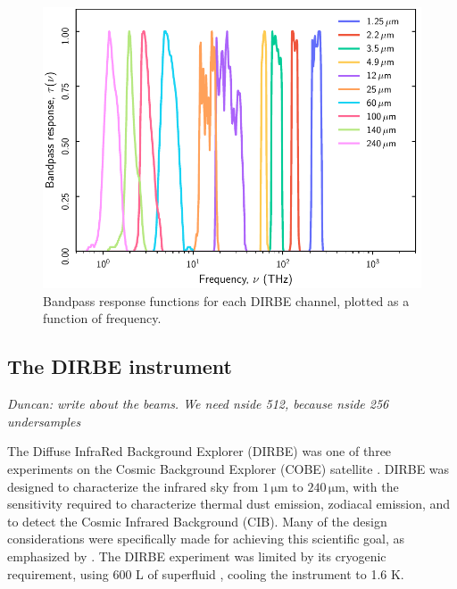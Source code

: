 \documentclass{aa}
\begin{document}
\begin{figure}
  \centering
  \includegraphics[width=\linewidth]{figs/DIRBE_bp.pdf}
  \caption{Bandpass response functions for each DIRBE channel, plotted as a function of frequency.}
  \label{fig:bandpass}
\end{figure}


\subsection{The DIRBE instrument}

\textit{Duncan: write about the beams. We need nside 512, because nside 256 undersamples}

The Diffuse InfraRed Background Explorer (DIRBE) was one of three experiments on the Cosmic Background Explorer (COBE) satellite \citep{boggess92}. DIRBE was designed to characterize the infrared sky from $1\,\mathrm{\mu m}$ to $240\,\mathrm{\mu m}$, with the sensitivity required to characterize thermal dust emission, zodiacal emission, and to detect the Cosmic Infrared Background (CIB). Many of the design considerations were specifically made for achieving this scientific goal, as emphasized by \citet{silverberg93}. The DIRBE experiment was limited by its cryogenic requirement, using 600 L of superfluid , cooling the instrument to 1.6 K.
\end{document}
